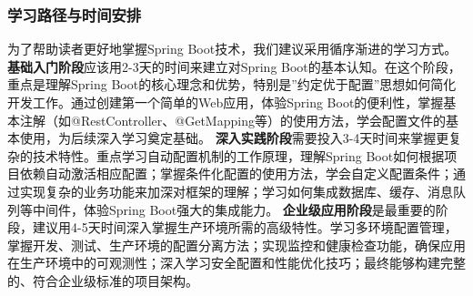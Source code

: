 \subsubsection{学习路径与时间安排}\label{ux5b66ux4e60ux8defux5f84ux4e0eux65f6ux95f4ux5b89ux6392} 为了帮助读者更好地掌握Spring
Boot技术，我们建议采用循序渐进的学习方式。 \textbf{基础入门阶段}应该用2-3天的时间来建立对Spring Boot的基本认知。在这个阶段，重点是理解Spring
Boot的核心理念和优势，特别是''约定优于配置''思想如何简化开发工作。通过创建第一个简单的Web应用，体验Spring
Boot的便利性，掌握基本注解（如@RestController、@GetMapping等）的使用方法，学会配置文件的基本使用，为后续深入学习奠定基础。
\textbf{深入实践阶段}需要投入3-4天时间来掌握更复杂的技术特性。重点学习自动配置机制的工作原理，理解Spring
Boot如何根据项目依赖自动激活相应配置；掌握条件化配置的使用方法，学会自定义配置条件；通过实现复杂的业务功能来加深对框架的理解；学习如何集成数据库、缓存、消息队列等中间件，体验Spring Boot强大的集成能力。
\textbf{企业级应用阶段}是最重要的阶段，建议用4-5天时间深入掌握生产环境所需的高级特性。学习多环境配置管理，掌握开发、测试、生产环境的配置分离方法；实现监控和健康检查功能，确保应用在生产环境中的可观测性；深入学习安全配置和性能优化技巧；最终能够构建完整的、符合企业级标准的项目架构。
